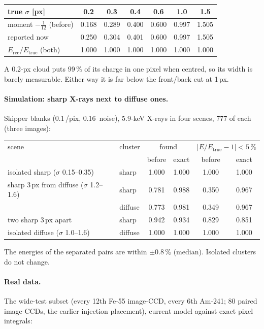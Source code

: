 \begin{table}[H]\centering\footnotesize
\begin{tabular}{lcccccc}
\toprule
true $\sigma$ [px] & 0.2 & 0.3 & 0.4 & 0.6 & 1.0 & 1.5 \\
\midrule
moment $-\tfrac1{12}$ (before) & 0.168 & 0.289 & 0.400 & 0.600 & 0.997 & 1.505 \\
reported now & 0.250 & 0.304 & 0.401 & 0.600 & 0.997 & 1.505 \\
$E_\mathrm{rec}/E_\mathrm{true}$ (both) & 1.000 & 1.000 & 1.000 & 1.000 & 1.000 & 1.000 \\
\bottomrule
\end{tabular}
\end{table}
\noindent A 0.2-px cloud puts 99\,\% of its charge in one pixel when centred, so its width is barely measurable. Either
way it is far below the front/back cut at 1\,px.

\paragraph{Simulation: sharp X-rays next to diffuse ones.} Skipper blanks (0.1\,\el/pix, 0.16\,\el{} noise), 5.9-keV
X-rays in four scenes, 777 of each (three images):

\begin{table}[H]\centering\footnotesize
\begin{tabular}{llcccc}
\toprule
scene & cluster & \multicolumn{2}{c}{found} & \multicolumn{2}{c}{$|E/E_\mathrm{true}-1|<5\,\%$} \\
 & & before & exact & before & exact \\
\midrule
isolated sharp ($\sigma$ 0.15--0.35) & sharp & 1.000 & 1.000 & 1.000 & 1.000 \\
sharp 3\,px from diffuse ($\sigma$ 1.2--1.6) & sharp & 0.781 & 0.988 & 0.350 & 0.967 \\
 & diffuse & 0.773 & 0.981 & 0.349 & 0.967 \\
two sharp 3\,px apart & sharp & 0.942 & 0.934 & 0.829 & 0.851 \\
isolated diffuse ($\sigma$ 1.0--1.6) & diffuse & 1.000 & 1.000 & 1.000 & 1.000 \\
\bottomrule
\end{tabular}
\end{table}
\noindent The energies of the separated pairs are within $\pm0.8\,\%$ (median). Isolated clusters do not change.

\paragraph{Real data.} The wide-test subset (every 12th Fe-55 image-CCD, every 6th Am-241; 80 paired image-CCDs, the
earlier injection placement), current model against exact pixel integrals:

